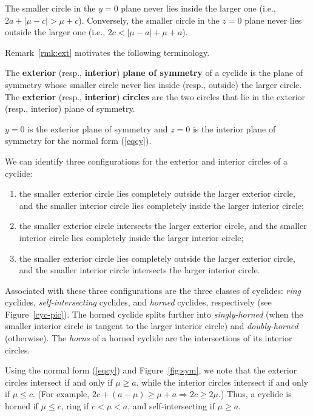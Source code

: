 \begin{rmk}
\label{rmk:ext}
The smaller circle in the $y=0$ plane never lies inside the larger one
(i.e., $2a + |\mu - c| > \mu + c$).
Conversely, the smaller circle in the $z=0$ plane never lies outside the 
larger one (i.e., $2c < |\mu - a| + \mu + a$).
\end{rmk}

Remark~\ref{rmk:ext} motivates the following terminology.

\begin{defn2}
The {\bf exterior} (resp., {\bf interior}) {\bf plane of symmetry} of a cyclide
is the plane of symmetry whose smaller circle never lies inside 
(resp., outside) the larger circle.
The {\bf exterior} (resp., {\bf interior}) {\bf circles} are the two circles 
that lie in the exterior (resp., interior) plane of symmetry.
\end{defn2}

\begin{rmk}
$y=0$ is the exterior plane of symmetry and 
$z=0$ is the interior plane of symmetry for the normal form (\ref{eqcy}).
\end{rmk}

We can identify three configurations for the
exterior and interior circles of a cyclide:
\begin{enumerate}
\item
	the smaller exterior circle lies completely outside the larger exterior
	circle, and the smaller interior circle lies completely inside the
	larger interior circle;
\item
	the smaller exterior circle intersects the larger exterior circle,
	and the smaller interior circle lies completely inside the
	larger interior circle;
\item
	the smaller exterior circle lies completely outside the larger exterior
	circle, and the smaller interior circle intersects the
	larger interior circle.
\end{enumerate}

Associated with these three configurations are the three classes of cyclides:
{\em ring} cyclides, {\em self-intersecting} 
cyclides, and {\em horned} cyclides, respectively (see Figure~\ref{cyc-pic}).
The horned cyclide splits further into {\em singly-horned}
(when the smaller interior circle is tangent to the 
larger interior circle) and {\em doubly-horned} (otherwise).
The {\em horns} of a horned cyclide are the intersections of its interior
circles.

\begin{rmk}
\label{rmk:rel}
Using the normal form (\ref{eqcy}) and Figure~\ref{fig:sym},
we note that the exterior circles intersect if and only if $\mu \geq a$,
while the interior circles intersect if and only if $\mu \leq c$.
(For example, $2c + (a-\mu) \geq \mu+a \Rightarrow 2c \geq 2\mu$.)
Thus, a cyclide is horned if $\mu \leq c$, ring if $c < \mu < a$, 
and self-intersecting if $\mu \geq a$.
\end{rmk}

